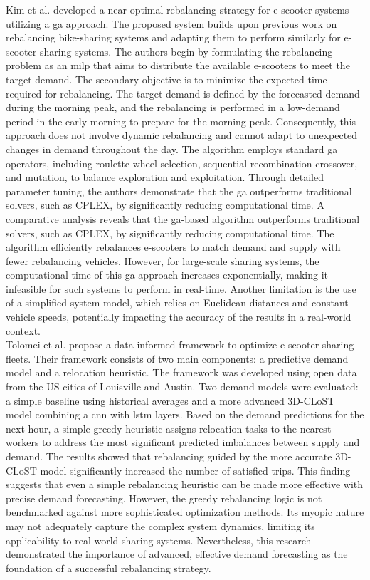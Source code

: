 Kim et al. \cite{kim_optimal_2023} developed a near-optimal rebalancing strategy for e-scooter systems utilizing a \gls{ga} approach. 
The proposed system builds upon previous work on rebalancing bike-sharing systems and adapting them to perform similarly for e-scooter-sharing systems. 
The authors begin by formulating the rebalancing problem as an \gls{milp} that aims to distribute the available e-scooters to meet the target demand.
The secondary objective is to minimize the expected time required for rebalancing.
The target demand is defined by the forecasted demand during the morning peak, and the rebalancing is performed in a low-demand period in the early morning to prepare for the morning peak. 
Consequently, this approach does not involve dynamic rebalancing and cannot adapt to unexpected changes in demand throughout the day.
The algorithm employs standard \gls{ga} operators, including roulette wheel selection, sequential recombination crossover, and mutation, to balance exploration and exploitation.
Through detailed parameter tuning, the authors demonstrate that the \gls{ga} outperforms traditional solvers, such as CPLEX, by significantly reducing computational time. 
A comparative analysis reveals that the \gls{ga}-based algorithm outperforms traditional solvers, such as CPLEX, by significantly reducing computational time.
The algorithm efficiently rebalances e-scooters to match demand and supply with fewer rebalancing vehicles.
However, for large-scale sharing systems, the computational time of this \gls{ga} approach increases exponentially, making it infeasible for such systems to perform in real-time.
Another limitation is the use of a simplified system model, which relies on Euclidean distances and constant vehicle speeds, potentially impacting the accuracy of the results in a real-world context.
\\

Tolomei et al. \cite{tolomei_benefits_2021} propose a data-informed framework to optimize e-scooter sharing fleets. 
Their framework consists of two main components: a predictive demand model and a relocation heuristic. 
The framework was developed using open data from the US cities of Louisville and Austin.
Two demand models were evaluated: a simple baseline using historical averages and a more advanced 3D-CLoST model combining a \gls{cnn} with \gls{lstm} layers.
Based on the demand predictions for the next hour, a simple greedy heuristic assigns relocation tasks to the nearest workers to address the most significant predicted imbalances between supply and demand.
The results showed that rebalancing guided by the more accurate 3D-CLoST model significantly increased the number of satisfied trips.
This finding suggests that even a simple rebalancing heuristic can be made more effective with precise demand forecasting.
However, the greedy rebalancing logic is not benchmarked against more sophisticated optimization methods. Its myopic nature may not adequately capture the complex system dynamics, limiting its applicability to real-world sharing systems.
Nevertheless, this research demonstrated the importance of advanced, effective demand forecasting as the foundation of a successful rebalancing strategy.
\\

